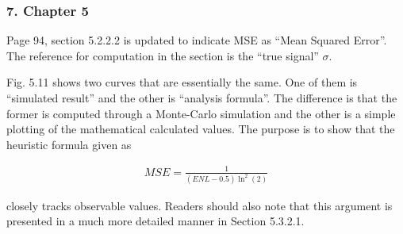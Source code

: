 \documentclass{article}
\begin{document}
\subsubsection*{7. Chapter 5}

Page 94, section 5.2.2.2 is updated to indicate MSE as ``Mean Squared Error''.
The reference for computation in the section is the ``true signal'' $\sigma$.

Fig. 5.11 shows two curves that are essentially the same.
One of them is ``simulated result'' and the other is ``analysis formula''.
The difference is that the former is computed through a Monte-Carlo simulation and the other is a simple plotting of the mathematical calculated values.
The purpose is to show that the heuristic formula given as

\begin{align*}
  MSE = \frac{1}{(ENL-0.5)\ln^2(2)}
\end{align*}  

closely tracks observable values.
Readers should also note that this argument is presented in a much more detailed manner in Section 5.3.2.1.
\end{document}
